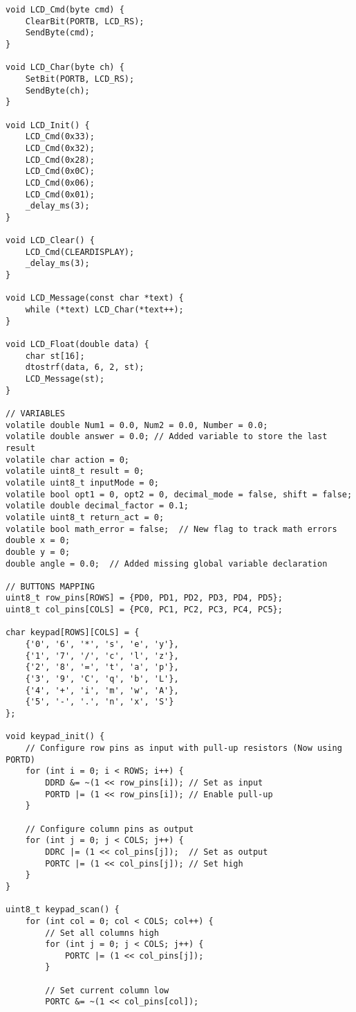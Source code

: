 \documentclass{article}
\begin{document}
\begin{verbatim}
void LCD_Cmd(byte cmd) {
    ClearBit(PORTB, LCD_RS);
    SendByte(cmd);
}

void LCD_Char(byte ch) {
    SetBit(PORTB, LCD_RS);
    SendByte(ch);
}

void LCD_Init() {
    LCD_Cmd(0x33);
    LCD_Cmd(0x32);
    LCD_Cmd(0x28);
    LCD_Cmd(0x0C);
    LCD_Cmd(0x06);
    LCD_Cmd(0x01);
    _delay_ms(3);
}

void LCD_Clear() {
    LCD_Cmd(CLEARDISPLAY);
    _delay_ms(3);
}

void LCD_Message(const char *text) {
    while (*text) LCD_Char(*text++);
}

void LCD_Float(double data) {
    char st[16];
    dtostrf(data, 6, 2, st);
    LCD_Message(st);
}

// VARIABLES
volatile double Num1 = 0.0, Num2 = 0.0, Number = 0.0;
volatile double answer = 0.0; // Added variable to store the last result
volatile char action = 0;
volatile uint8_t result = 0;
volatile uint8_t inputMode = 0;
volatile bool opt1 = 0, opt2 = 0, decimal_mode = false, shift = false;
volatile double decimal_factor = 0.1;
volatile uint8_t return_act = 0;
volatile bool math_error = false;  // New flag to track math errors
double x = 0;
double y = 0;
double angle = 0.0;  // Added missing global variable declaration

// BUTTONS MAPPING
uint8_t row_pins[ROWS] = {PD0, PD1, PD2, PD3, PD4, PD5};
uint8_t col_pins[COLS] = {PC0, PC1, PC2, PC3, PC4, PC5};

char keypad[ROWS][COLS] = {
    {'0', '6', '*', 's', 'e', 'y'},
    {'1', '7', '/', 'c', 'l', 'z'},
    {'2', '8', '=', 't', 'a', 'p'},
    {'3', '9', 'C', 'q', 'b', 'L'},
    {'4', '+', 'i', 'm', 'w', 'A'},
    {'5', '-', '.', 'n', 'x', 'S'}
};

void keypad_init() {
    // Configure row pins as input with pull-up resistors (Now using PORTD)
    for (int i = 0; i < ROWS; i++) {
        DDRD &= ~(1 << row_pins[i]); // Set as input
        PORTD |= (1 << row_pins[i]); // Enable pull-up
    }

    // Configure column pins as output
    for (int j = 0; j < COLS; j++) {
        DDRC |= (1 << col_pins[j]);  // Set as output
        PORTC |= (1 << col_pins[j]); // Set high
    }
}

uint8_t keypad_scan() {
    for (int col = 0; col < COLS; col++) {
        // Set all columns high
        for (int j = 0; j < COLS; j++) {
            PORTC |= (1 << col_pins[j]);
        }
        
        // Set current column low
        PORTC &= ~(1 << col_pins[col]);
        

\end{verbatim}
\end{document}
